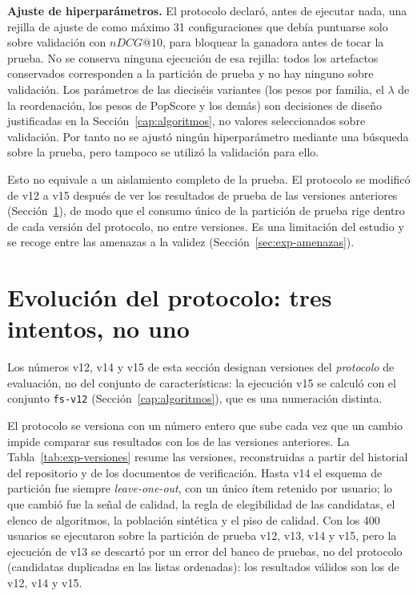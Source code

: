 \textbf{Ajuste de hiperparámetros.} El protocolo declaró, antes de ejecutar nada, una rejilla de ajuste de como
máximo 31 configuraciones que debía puntuarse solo sobre validación con \(nDCG@10\), para bloquear la ganadora antes
de tocar la prueba. No se conserva ninguna ejecución de esa rejilla: todos los artefactos conservados corresponden a
la partición de prueba y no hay ninguno sobre validación. Los parámetros de las dieciséis variantes (los pesos por
familia, el \(\lambda\) de la reordenación, los pesos de PopScore y los demás) son decisiones de diseño justificadas
en la Sección~\ref{cap:algoritmos}, no valores seleccionados sobre validación. Por tanto no se ajustó ningún
hiperparámetro mediante una búsqueda sobre la prueba, pero tampoco se utilizó la validación para ello.

Esto no equivale a un aislamiento completo de la prueba. El protocolo se modificó de v12 a v15 después de ver los
resultados de prueba de las versiones anteriores (Sección~\ref{sec:exp-evolucion}), de modo que el consumo único de la
partición de prueba rige dentro de cada versión del protocolo, no entre versiones. Es una limitación del estudio y se
recoge entre las amenazas a la validez (Sección~\ref{sec:exp-amenazas}).

\section{Evolución del protocolo: tres intentos, no uno}\label{sec:exp-evolucion}\label{sec:exp-v15-fidelidad}

Los números v12, v14 y v15 de esta sección designan versiones del \emph{protocolo} de evaluación, no
del conjunto de características: la ejecución v15 se calculó con el conjunto \texttt{fs-v12}
(Sección~\ref{cap:algoritmos}), que es una numeración distinta.

El protocolo se versiona con un número entero que sube cada vez que un cambio impide comparar sus resultados con los
de las versiones anteriores. La Tabla~\ref{tab:exp-versiones} resume las versiones, reconstruidas a partir del
historial del repositorio y de los documentos de verificación. Hasta v14 el esquema de partición fue siempre
\emph{leave-one-out}, con un único ítem retenido por usuario; lo que cambió fue la señal de calidad, la regla de
elegibilidad de las candidatas, el elenco de algoritmos, la población sintética y el piso de calidad. Con los 400
usuarios se ejecutaron sobre la partición de prueba v12, v13, v14 y v15, pero la ejecución de v13 se descartó por un
error del banco de pruebas, no del protocolo (candidatas duplicadas en las listas ordenadas): los resultados válidos
son los de v12, v14 y v15.

